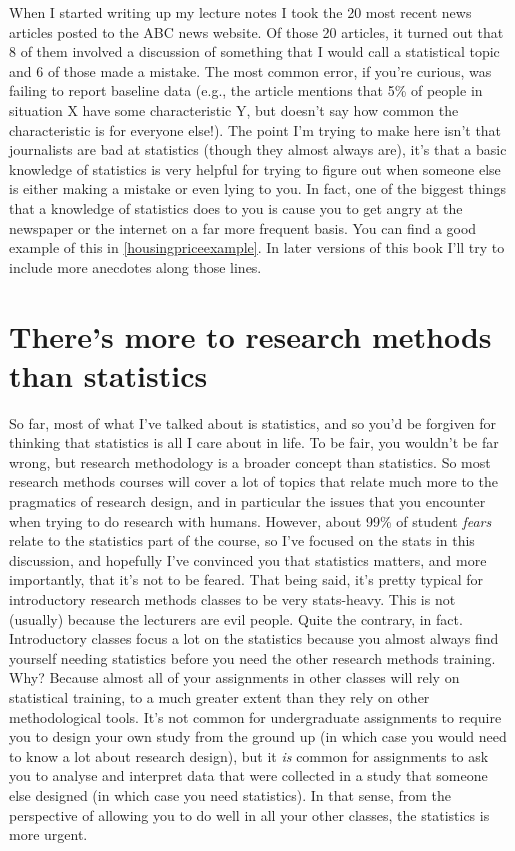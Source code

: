 \documentclass[
]{book}
\begin{document}
\hfill\break
When I started writing up my lecture notes I took the 20 most recent news articles posted to the ABC news website. Of those 20 articles, it turned out that 8 of them involved a discussion of something that I would call a statistical topic and 6 of those made a mistake. The most common error, if you're curious, was failing to report baseline data (e.g., the article mentions that 5\% of people in situation X have some characteristic Y, but doesn't say how common the characteristic is for everyone else!). The point I'm trying to make here isn't that journalists are bad at statistics (though they almost always are), it's that a basic knowledge of statistics is very helpful for trying to figure out when someone else is either making a mistake or even lying to you. In fact, one of the biggest things that a knowledge of statistics does to you is cause you to get angry at the newspaper or the internet on a far more frequent basis. You can find a good example of this in \ref{housingpriceexample}. In later versions of this book I'll try to include more anecdotes along those lines.

\hypertarget{theres-more-to-research-methods-than-statistics}{%
\section{There's more to research methods than statistics}\label{theres-more-to-research-methods-than-statistics}}

So far, most of what I've talked about is statistics, and so you'd be forgiven for thinking that statistics is all I care about in life. To be fair, you wouldn't be far wrong, but research methodology is a broader concept than statistics. So most research methods courses will cover a lot of topics that relate much more to the pragmatics of research design, and in particular the issues that you encounter when trying to do research with humans. However, about 99\% of student \emph{fears} relate to the statistics part of the course, so I've focused on the stats in this discussion, and hopefully I've convinced you that statistics matters, and more importantly, that it's not to be feared. That being said, it's pretty typical for introductory research methods classes to be very stats-heavy. This is not (usually) because the lecturers are evil people. Quite the contrary, in fact. Introductory classes focus a lot on the statistics because you almost always find yourself needing statistics before you need the other research methods training. Why? Because almost all of your assignments in other classes will rely on statistical training, to a much greater extent than they rely on other methodological tools. It's not common for undergraduate assignments to require you to design your own study from the ground up (in which case you would need to know a lot about research design), but it \emph{is} common for assignments to ask you to analyse and interpret data that were collected in a study that someone else designed (in which case you need statistics). In that sense, from the perspective of allowing you to do well in all your other classes, the statistics is more urgent.
\end{document}

